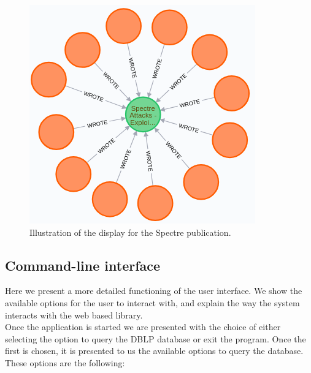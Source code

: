 \documentclass[twocolumn]{article}
\begin{document}
\begin{figure}[t]
\centering
\includegraphics[scale=0.55]{spectre.png}
\caption{Illustration of the display for the Spectre publication.}
\end{figure}

\subsection{Command-line interface}
Here we present a more detailed functioning of the user interface. We show the available options for the user to interact with, and explain the way the system interacts with the web based library.
\\[1\baselineskip]
Once the application is started we are presented with the choice of either selecting the option to query the DBLP database or exit the program. Once the first is chosen, it is presented to us the available options to query the database. These options are the following:
\end{document}
